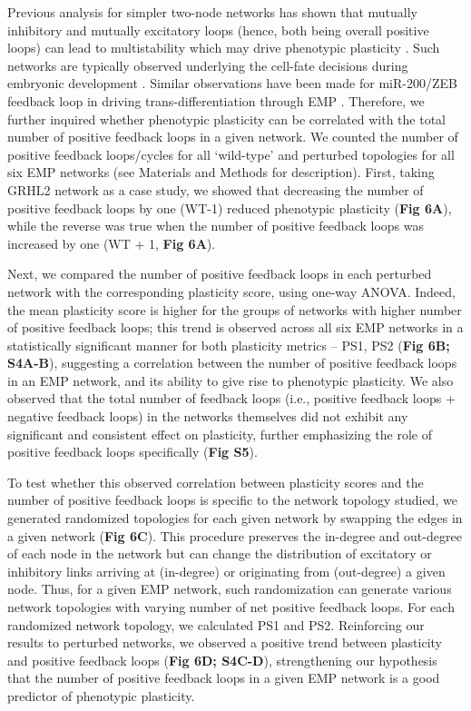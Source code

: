 \documentclass[preprint,review,12pt]{elsarticle}
\begin{document}
	Previous analysis for simpler two-node networks has shown that mutually inhibitory and mutually excitatory loops (hence, both being overall positive loops) can lead to multistability which may drive phenotypic plasticity \cite{Chickarmane2006, Gardner2000}. Such networks are typically observed underlying the cell-fate decisions during embryonic development \cite{Zhou2011}. Similar observations have been made for miR-200/ZEB feedback loop in driving trans-differentiation through EMP \cite{Lu2013,Celia-Terrassa2018}. Therefore, we further inquired whether phenotypic plasticity can be correlated with the total number of positive feedback loops in a given network. We counted the number of positive feedback loops/cycles for all ‘wild-type’ and perturbed topologies for all six EMP networks (see Materials and Methods for description). First, taking GRHL2 network as a case study, we showed that decreasing the number of positive feedback loops by one (WT-1) reduced phenotypic plasticity (\textbf{Fig 6A}), while the reverse was true when the number of positive feedback loops was increased by one (WT + 1, \textbf{Fig 6A}).
	
	Next, we compared the number of positive feedback loops in each perturbed network with the corresponding plasticity score, using one-way ANOVA. Indeed, the mean plasticity score is higher for the groups of networks with higher number of positive feedback loops; this trend is observed across all six EMP networks in a statistically significant manner for both plasticity metrics – PS1, PS2 (\textbf{Fig 6B; S4A-B}), suggesting a correlation between the number of positive feedback loops in an EMP network, and its ability to give rise to phenotypic plasticity. We also observed that the total number of feedback loops (i.e., positive feedback loops + negative feedback loops) in the networks themselves did not exhibit any significant and consistent effect on plasticity, further emphasizing the role of  positive feedback loops specifically (\textbf{Fig S5}).
	
	To test whether this observed correlation between plasticity scores and the number of positive feedback loops is specific to the network topology studied, we generated randomized topologies for each given network by swapping the edges in a given network (\textbf{Fig 6C}). This procedure preserves the in-degree and out-degree of each node in the network but can change the distribution of excitatory or inhibitory links arriving at (in-degree) or originating from (out-degree) a given node. Thus, for a given EMP network, such randomization can generate various network topologies with varying number of net positive feedback loops. For each randomized network topology, we calculated PS1 and PS2. Reinforcing our results to perturbed networks, we observed a positive trend between plasticity and positive feedback loops (\textbf{Fig 6D; S4C-D}), strengthening our hypothesis that the number of positive feedback loops in a given EMP network is a good predictor of phenotypic plasticity.
	
\end{document}

